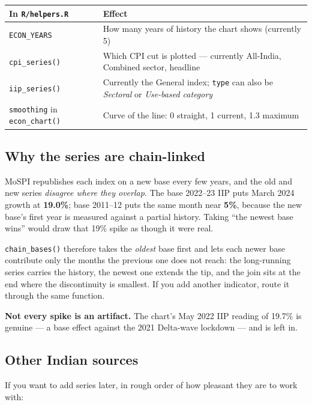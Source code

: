 \documentclass[11pt,a4paper]{article}
\newcommand{\file}[1]{\texttt{#1}}
\begin{document}
\begin{center}
\begin{tabular}{@{}lp{8.5cm}@{}}
\toprule
\textbf{In \file{R/helpers.R}} & \textbf{Effect} \\
\midrule
\texttt{ECON\_YEARS} & How many years of history the chart shows (currently 5) \\
\texttt{cpi\_series()} & Which CPI cut is plotted --- currently All-India, Combined sector, headline \\
\texttt{iip\_series()} & Currently the General index; \texttt{type} can also be \emph{Sectoral} or \emph{Use-based category} \\
\texttt{smoothing} in \texttt{econ\_chart()} & Curve of the line: 0 straight, 1 current, 1.3 maximum \\
\bottomrule
\end{tabular}
\end{center}

\subsection{Why the series are chain-linked}\label{sec:chain}

MoSPI republishes each index on a new base every few years, and the old and
new series \emph{disagree where they overlap}. The base 2022--23 IIP puts
March 2024 growth at \textbf{19.0\%}; base 2011--12 puts the same month near
\textbf{5\%}, because the new base's first year is measured against a partial
history. Taking ``the newest base wins'' would draw that 19\% spike as though
it were real.

\texttt{chain\_bases()} therefore takes the \emph{oldest} base first and lets
each newer base contribute only the months the previous one does not reach:
the long-running series carries the history, the newest one extends the tip,
and the join sits at the end where the discontinuity is smallest. If you add
another indicator, route it through the same function.

\textbf{Not every spike is an artifact.} The chart's May 2022 IIP reading of
19.7\% is genuine --- a base effect against the 2021 Delta-wave lockdown ---
and is left in.

\subsection{Other Indian sources}

If you want to add series later, in rough order of how pleasant they are to
work with:
\end{document}
